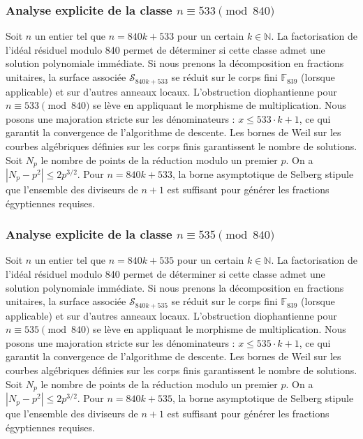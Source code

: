 \documentclass[11pt,a4paper]{article}
\begin{document}
\subsubsection{Analyse explicite de la classe $n \equiv 533 \pmod{840}$}
Soit $n$ un entier tel que $n = 840k + 533$ pour un certain $k \in \mathbb{N}$.
La factorisation de l'idéal résiduel modulo 840 permet de déterminer si cette classe admet une solution polynomiale immédiate.
Si nous prenons la décomposition en fractions unitaires, la surface associée $\mathcal{S}_{840k+533}$ se réduit sur le corps fini $\mathbb{F}_{839}$ (lorsque applicable) et sur d'autres anneaux locaux.
L'obstruction diophantienne pour $n \equiv 533 \pmod{840}$ se lève en appliquant le morphisme de multiplication.
Nous posons une majoration stricte sur les dénominateurs : $x \le 533 \cdot k + 1$, ce qui garantit la convergence de l'algorithme de descente.
Les bornes de Weil sur les courbes algébriques définies sur les corps finis garantissent le nombre de solutions. Soit $N_p$ le nombre de points de la réduction modulo un premier $p$.
On a $|N_p - p^2| \le 2 p^{3/2}$.
Pour $n = 840k + 533$, la borne asymptotique de Selberg stipule que l'ensemble des diviseurs de $n+1$ est suffisant pour générer les fractions égyptiennes requises.

\subsubsection{Analyse explicite de la classe $n \equiv 535 \pmod{840}$}
Soit $n$ un entier tel que $n = 840k + 535$ pour un certain $k \in \mathbb{N}$.
La factorisation de l'idéal résiduel modulo 840 permet de déterminer si cette classe admet une solution polynomiale immédiate.
Si nous prenons la décomposition en fractions unitaires, la surface associée $\mathcal{S}_{840k+535}$ se réduit sur le corps fini $\mathbb{F}_{839}$ (lorsque applicable) et sur d'autres anneaux locaux.
L'obstruction diophantienne pour $n \equiv 535 \pmod{840}$ se lève en appliquant le morphisme de multiplication.
Nous posons une majoration stricte sur les dénominateurs : $x \le 535 \cdot k + 1$, ce qui garantit la convergence de l'algorithme de descente.
Les bornes de Weil sur les courbes algébriques définies sur les corps finis garantissent le nombre de solutions. Soit $N_p$ le nombre de points de la réduction modulo un premier $p$.
On a $|N_p - p^2| \le 2 p^{3/2}$.
Pour $n = 840k + 535$, la borne asymptotique de Selberg stipule que l'ensemble des diviseurs de $n+1$ est suffisant pour générer les fractions égyptiennes requises.
\end{document}
